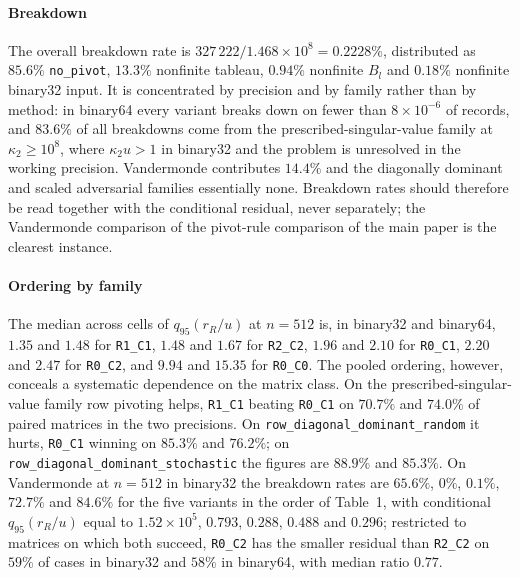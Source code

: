 \documentclass[supplement,review,onefignum,onetabnum]{siamart251216}
\begin{document}
\paragraph{Breakdown}
The overall breakdown rate is $327\,222/1.468\times10^{8}=0.2228\%$, distributed as $85.6\%$
\texttt{no\_pivot}, $13.3\%$ nonfinite tableau, $0.94\%$ nonfinite $B_l$ and $0.18\%$ nonfinite
binary32 input. It is concentrated by precision and by family rather than by method: in binary64
every variant breaks down on fewer than $8\times10^{-6}$ of records, and $83.6\%$ of all
breakdowns come from the prescribed-singular-value family at $\kappa_2\ge10^{8}$, where
$\kappa_2u>1$ in binary32 and the problem is unresolved in the working precision. Vandermonde
contributes $14.4\%$ and the diagonally dominant and scaled adversarial families essentially
none. Breakdown rates should therefore be read together with the conditional residual, never
separately; the Vandermonde comparison of the pivot-rule comparison of the main paper is the clearest instance.

\paragraph{Ordering by family}
The median across cells of $q_{95}(r_R/u)$ at $n=512$ is, in binary32 and binary64,
$1.35$ and $1.48$ for \texttt{R1\_C1}, $1.48$ and $1.67$ for \texttt{R2\_C2}, $1.96$ and $2.10$
for \texttt{R0\_C1}, $2.20$ and $2.47$ for \texttt{R0\_C2}, and $9.94$ and $15.35$ for
\texttt{R0\_C0}. The pooled ordering, however, conceals a systematic dependence on the matrix
class. On the prescribed-singular-value family row pivoting helps, \texttt{R1\_C1} beating
\texttt{R0\_C1} on $70.7\%$ and $74.0\%$ of paired matrices in the two precisions. On
\texttt{row\_diagonal\_dominant\_random} it hurts, \texttt{R0\_C1} winning on $85.3\%$ and
$76.2\%$; on \texttt{row\_diagonal\_dominant\_stochastic} the figures are $88.9\%$ and $85.3\%$.
On Vandermonde at $n=512$ in binary32 the breakdown rates are $65.6\%$, $0\%$, $0.1\%$, $72.7\%$
and $84.6\%$ for the five variants in the order of Table~1, with conditional
$q_{95}(r_R/u)$ equal to $1.52\times10^{5}$, $0.793$, $0.288$, $0.488$ and $0.296$; restricted
to matrices on which both succeed, \texttt{R0\_C2} has the smaller residual than \texttt{R2\_C2}
on $59\%$ of cases in binary32 and $58\%$ in binary64, with median ratio $0.77$.
\end{document}

